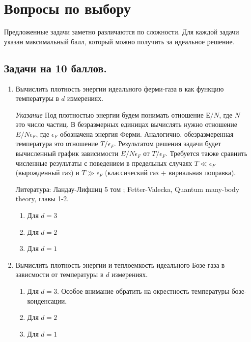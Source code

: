 \documentclass{article}
\newcounter{eee}
\begin{document}
\section*{Вопросы по выбору}


Предложенные задачи заметно различаются по сложности. Для каждой задачи указан максимальный балл, который можно получить за идеальное решение.



\subsection*{Задачи на 10 баллов.}

\begin{enumerate}

\item Вычислить плотность энергии идеального ферми-газа в как функцию температуры в $d$ измерениях. 

\textit{Указание} Под плотностью энергии будем понимать отношение $Е/N$, где $N$ это число частиц. В безразмерных единицах вычислять нужно отношение $E/N\epsilon_F$, где $\epsilon_F$ обозначена энергия Ферми. Аналогично, обезразмеренная температура это отношение $T/\epsilon_F$. Результатом решения задачи будет вычисленный график зависимости $E/N\epsilon_F$ от $T/\epsilon_F$. Требуется также сравнить численные результаты с поведением в предельных случаях $T \ll \epsilon_F$ (вырожденный газ) и $T \gg \epsilon_F$ (классический газ + вириальная поправка).

Литература: Ландау-Лифшиц 5 том ; Fetter-Valecka, Quantum many-body theory, главы 1-2.

\begin{enumerate}
\item Для $d = 3$
\item Для $d = 2$
\item Для $d = 1$
\end{enumerate}

\item Вычислить плотность энергии и теплоемкость идеального Бозе-газа в зависмости от температуры в $d$ измерениях. 

\begin{enumerate}
\item Для $d=3$. Особое внимание обратить на окрестность температуры бозе-конденсации.
\item Для $d=2$
\item Для $d=1$
\end{enumerate}



\setcounter{eee}{\value{enumi}}
\end{enumerate}
\end{document}
